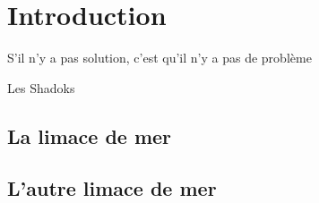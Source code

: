 \chapter{Introduction}

\epigraph{S'il n'y a pas solution, c'est qu'il n'y a pas de problème}{Les Shadoks}

\lipsum[1-4]

\section{La limace de mer}

\lipsum[2-4]

\section{L'autre limace de mer}


